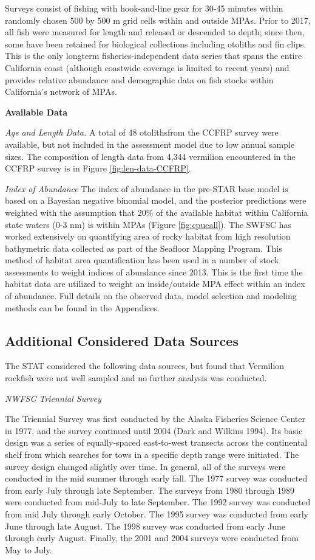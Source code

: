 \documentclass[
  english,
  a4paper,
]{article}
\begin{document}
Surveys consist of fishing with hook-and-line gear for 30-45 minutes within
randomly chosen 500 by 500 m grid cells within and outside MPAs.
Prior to 2017, all fish were measured for length and released or descended to depth;
since then, some have been retained for biological collections including otoliths and fin clips.
This is the only longterm fisheries-independent data series that spans the entire California
coast (although coastwide coverage is limited to recent years) and provides relative abundance and demographic data on fish stocks within California's network of MPAs.

\textbf{Available Data}

\emph{Age and Length Data.} A total of 48 otolithsfrom the CCFRP survey were available, but not included in the
assessment model due to low
annual sample sizes. The composition of length data from 4,344 vermilion encountered
in the CCFRP survey is in Figure \ref{fig:len-data-CCFRP}.

\emph{Index of Abundance}
The index of abundance in the pre-STAR base model is based on a Bayesian negative binomial
model, and the posterior predictions were weighted with the assumption that 20\% of
the available habitat within California state waters (0-3 nm) is within MPAs (Figure \ref{fig:cpueall}).
The SWFSC has worked extensively on quantifying area of rocky habitat from high resolution
bathymetric data collected as part of the Seafloor Mapping Program. This method of habitat area quantification has been used in a number of stock assessments to weight indices of abundance
since 2013. This is the first time the habitat data are utilized to weight an inside/outside
MPA effect within an index of abundance. Full details on the observed data, model selection and modeling methods can be found in the Appendices.

\hypertarget{additional-considered-data-sources}{%
\subsection{Additional Considered Data Sources}\label{additional-considered-data-sources}}

The STAT considered the following data sources, but found that Vermilion rockfish were not well sampled and no further analysis was conducted.

\emph{NWFSC Triennial Survey}

The Triennial Survey was first conducted by the Alaska Fisheries Science Center in 1977, and the survey
continued until 2004 (Dark and Wilkins 1994).
Its basic design was a series of equally-spaced east-to-west transects across
the continental shelf from which searches for tows in a specific depth range were initiated.
The survey design changed slightly over time.
In general, all of the surveys were conducted in the mid summer through early fall.
The 1977 survey was conducted from early July through late September.
The surveys from 1980 through 1989 were conducted from mid-July to late September.
The 1992 survey was conducted from mid July through early October.
The 1995 survey was conducted from early June through late August.
The 1998 survey was conducted from early June through early August.
Finally, the 2001 and 2004 surveys were conducted from May to July.
\end{document}
